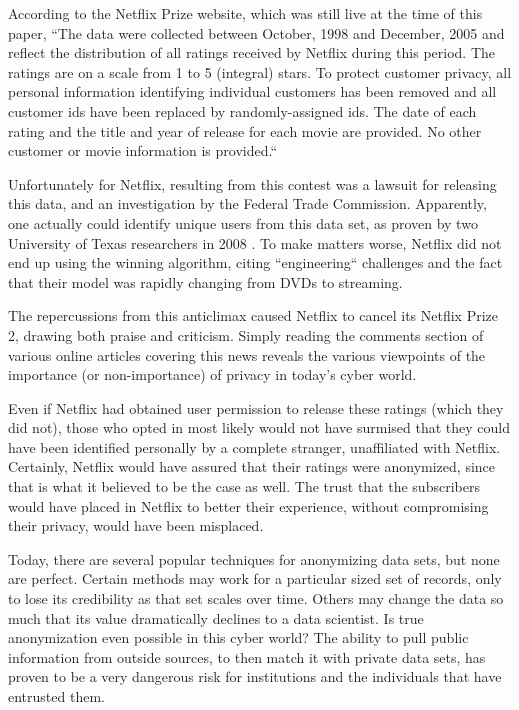 \documentclass[10pt,journal,compsoc]{IEEEtran}
\begin{document}
According to the Netflix Prize website, which was still live at the time of this paper, ``The data were collected between October, 1998 and December, 2005 and reflect the distribution of all ratings received by Netflix during this period. The ratings are on a scale from 1 to 5 (integral) stars. To protect customer privacy, all personal information identifying individual customers has been removed and all customer ids have been replaced by randomly-assigned ids. The date of each rating and the title and year of release for each movie are provided. No other customer or movie information is provided.``
	
Unfortunately for Netflix, resulting from this contest was a lawsuit for releasing this data, and an investigation by the Federal Trade Commission.    Apparently, one actually could identify unique users from this data set, as proven by two University of Texas researchers in 2008 \cite{narayanan}.  To make matters worse, Netflix did not end up using the winning algorithm, citing ``engineering`` challenges and the fact that their model was rapidly changing from DVDs to streaming\cite{johnston}.

The repercussions from this anticlimax caused Netflix to cancel its Netflix Prize 2, drawing both praise and criticism.  Simply reading the comments section of various online articles covering this news reveals the various viewpoints of the importance (or non-importance) of privacy in today’s cyber world.\cite{anderson, cheng, ohm}

Even if Netflix had obtained user permission to release these ratings (which they did not), those who opted in most likely would not have surmised that they could have been identified personally by a complete stranger, unaffiliated with Netflix.  Certainly, Netflix would have assured that their ratings were anonymized, since that is what it believed to be the case as well. The trust that the subscribers would have placed in Netflix to better their experience, without compromising their privacy, would have been misplaced.
	
Today, there are several popular techniques for anonymizing data sets, but none are perfect.  Certain methods may work for a particular sized set of records, only to lose its credibility as that set scales over time.  Others may change the data so much that its value dramatically declines to a data scientist. Is true anonymization even possible in this cyber world? The ability to pull public information from outside sources, to then match it with private data sets, has proven to be a very dangerous risk for institutions and the individuals that have entrusted them.
	
\end{document}
